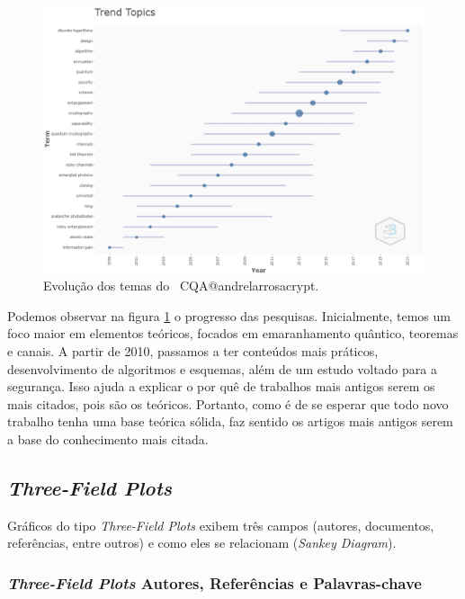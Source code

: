 \begin{figure}
    \centering
    \includegraphics[width=1\textwidth]{experiments/andrelarrosacrypt/AnaliseBibliometrica/CriptografiaQuantica/imagens/CQA@andrelarrosacrypt_Topicos.png}
    \caption{Evolução dos temas do \dataset\ CQA@andrelarrosacrypt.}
    \label{CQA@andrelarrosacrypt_Topicos}
\end{figure}

Podemos observar na figura \ref{CQA@andrelarrosacrypt_Topicos} o progresso das pesquisas. Inicialmente, temos um foco maior em elementos teóricos, focados em emaranhamento quântico, teoremas e canais. A partir de 2010, passamos a ter conteúdos mais práticos, desenvolvimento de algoritmos e esquemas, além de um estudo voltado para a segurança. Isso ajuda a explicar o por quê de trabalhos mais antigos serem os mais citados, pois são os teóricos. Portanto, como é de se esperar que todo novo trabalho tenha uma base teórica sólida, faz sentido os artigos mais antigos serem a base do conhecimento mais citada.

\subsection{\textit{Three-Field Plots}}

Gráficos do tipo \textit{Three-Field Plots} exibem três campos (autores, documentos, referências, entre outros) e como eles se relacionam (\textit{Sankey Diagram}).

\subsubsection{\textit{Three-Field Plots} Autores, Referências e Palavras-chave}

